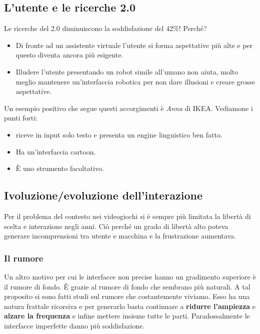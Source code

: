 		\subsection{L'utente e le ricerche 2.0}
			Le ricerche del 2.0 diminuiscono la soddisfazione del 42\%! Perché?
			\begin{itemize}
				\item Di fronte ad un assistente virtuale l'utente si forma aspettative più alte e per questo diventa ancora più esigente.
				\item Illudere l'utente presentando un robot simile all'umano non aiuta, molto meglio mantenere un'interfaccia robotica per non dare illusioni e creare grosse aspettative.
			\end{itemize}
			Un esempio positivo che segue questi accorgimenti è \emph{Anna} di IKEA. Vediamone i punti forti:
			\begin{itemize}
				\item riceve in input solo testo e presenta un engine linguistico ben fatto. 
				\item Ha un'interfaccia cartoon.
				\item È uno strumento facoltativo.
			\end{itemize}
		
		\subsection{Ivoluzione/evoluzione dell'interazione}
			Per il problema del contesto nei videogiochi si è sempre più limitata la libertà di scelta e interazione negli anni. Ciò perché un grado di libertà alto poteva generare incomprensioni tra utente e macchina e la frustrazione aumentava.
		
			\subsubsection{Il rumore}
				Un altro motivo per cui le interfacce non precise hanno un gradimento superiore è il rumore di fondo. È grazie al rumore di fondo che sembrano più naturali. A tal proposito si sono fatti studi sul rumore che costantemente viviamo. Esso ha una natura frattale ricorsiva e per generarlo basta continuare a \textbf{ridurre l'ampiezza} e \textbf{alzare la frequenza} e infine mettere insieme tutte le parti.
				Paradossalmente le interfacce imperfette danno più soddisfazione.